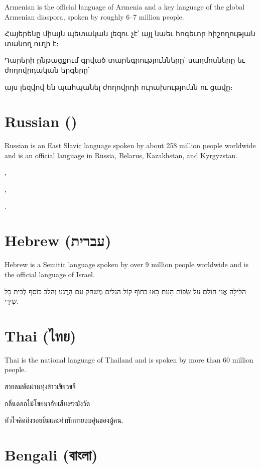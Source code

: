 \documentclass[a4paper,twoside]{article}
\begin{document}
Armenian is the official language of Armenia and a key language of the global Armenian diaspora, spoken by roughly 6--7 million people.

\textarmenian{Հայերենը միայն պետական լեզու չէ՝ այլ նաեւ հոգեւոր հիշողության տանող ուղի է։}

\textarmenian{Դարերի ընթացքում գրված տարեգրությունները՝ սաղմոսները եւ ժողովրդական երգերը՝}

\textarmenian{այս լեզվով են պահպանել ժողովրդի ուրախությունն ու ցավը։}

\section{Russian ()}\label{russian-russkii}

Russian is an East Slavic language spoken by about 258 million people worldwide and is an official language in Russia, Belarus, Kazakhstan, and Kyrgyzstan.

,

,


.

\section{Hebrew (\texthebrew{עברית})}\label{hebrew-bryt}

Hebrew is a Semitic language spoken by over 9 million people worldwide and is the official language of Israel.

\texthebrew{הַלֵּילָה אֲנִי חוֹלֵם עַל שָׂפוֹת הָעֵת בָּאוּ בַּחוֹף
קוֹל הַגַּלִּים מְשַׁחֵק עִם הָרֶגַע
וְהַלֵּב כּוֹסֵף לְבֵית כָּל שִׁירַי}.

\section{Thai (\textthai{ไทย})}\label{thai-aithy}

Thai is the national language of Thailand and is spoken by more than 60 million people.

\textthai{สายลมพัดผ่านทุ่งข้าวเขียวขจี}

\textthai{กลิ่นดอกไม้โชยมากับเสียงระฆังวัด}

\textthai{หัวใจคิดถึงรอยยิ้มและคำทักทายอบอุ่นของผู้คน}.

\section{Bengali (\textbengali{বাংলা})}\label{bengali-baanlaa}
\end{document}
